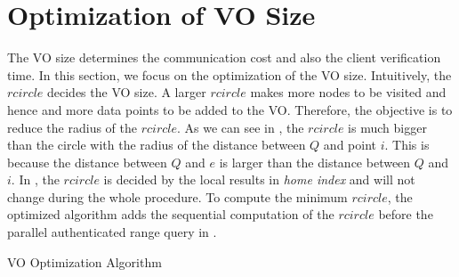 \section{Optimization of VO Size}\label{sec:knn:opt}

The VO size determines the communication cost and also the client verification time. In this section, we focus on the optimization of the VO size. Intuitively, the $rcircle$ decides the VO size. A larger $rcircle$ makes more nodes to be visited and hence and more data points to be added to the VO\@. Therefore, the objective is to reduce the radius of the $rcircle$. As we can see in , the $rcircle$ is much bigger than the circle with the radius of the distance between $Q$ and point $i$. This is because the distance between $Q$ and $e$ is larger than the distance between $Q$ and $i$. In , the $rcircle$ is decided by the local results in \emph{home index} and will not change during the whole procedure. To compute the minimum $rcircle$, the optimized algorithm adds the sequential computation of the $rcircle$ before the parallel authenticated range query in .

\begin{algorithm}[t]
  \caption{VO Optimization Algorithm}\label{alg:knn:opt}
\end{algorithm}

